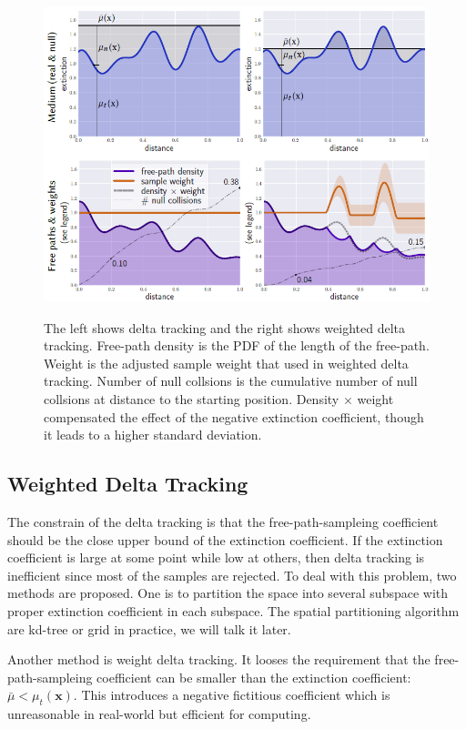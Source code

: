 \documentclass[acmtog]{acmart}
\begin{document}
\begin{figure}[htbp]
	\includegraphics[width=\linewidth]{figure/weighted delta tracking.png}
	\label{delta_tracking}
	\caption{
		The left shows delta tracking and the right shows weighted delta tracking.
		Free-path density is the PDF of the length of the free-path.
		Weight is the adjusted sample weight that used in weighted delta tracking.
		Number of null collsions is the cumulative number of null collsions at distance to the starting position. 
		Density $\times$ weight compensated the effect of the negative extinction coefficient, though it leads to a higher standard deviation.	
	}
\end{figure}

\subsection{Weighted Delta Tracking}
The constrain of the delta tracking is that the free-path-sampleing coefficient should be the close upper bound of the extinction coefficient.
If the extinction coefficient is large at some point while low at others, then delta tracking is inefficient since most of the samples are rejected.
To deal with this problem, two methods are proposed.
One is to partition the space into several subspace with proper extinction coefficient in each subspace.
The spatial partitioning algorithm are kd-tree or grid in practice, we will talk it later.

Another method is weight delta tracking.
It looses the requirement that the free-path-sampleing coefficient can be smaller than the extinction coefficient: $\bar\mu<\mu_t(\mathbf x)$.
This introduces a negative fictitious coefficient which is unreasonable in real-world but efficient for computing.
\end{document}
